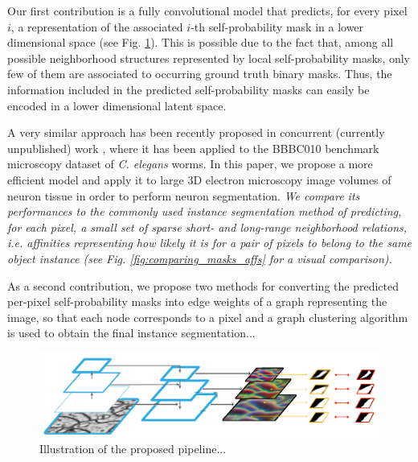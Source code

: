 Our first contribution is a fully convolutional model that predicts, for every pixel $i$, a representation of the associated $i$-th self-probability mask in a lower dimensional space (see Fig. \ref{fig:main_figure}). This is possible due to the fact that, among all possible neighborhood structures represented by local self-probability masks, only few of them are associated to occurring ground truth binary masks. Thus, the information included in the predicted self-probability masks can easily be encoded in a lower dimensional latent space. 

A very similar approach has been recently proposed in concurrent (currently unpublished) work \cite{hirsch2020patchperpix}, where it has been applied to the BBBC010 benchmark microscopy dataset of \emph{C. elegans} worms. In this paper, we propose a more efficient model and apply it to large 3D electron microscopy image volumes of neuron tissue in order to perform neuron segmentation. 
\emph{We compare its performances to the commonly used instance segmentation method of predicting, for each pixel, a small set of sparse short- and long-range neighborhood relations, i.e. affinities representing how likely it is for a pair of pixels to belong to the same object instance (see Fig. \ref{fig:comparing_masks_affs} for a visual comparison).}

As a second contribution, we propose two methods for converting the predicted per-pixel self-probability masks into edge weights of a graph representing the image, so that each node corresponds to a pixel and a graph clustering algorithm is used to obtain the final instance segmentation... 

\begin{figure}[t]
\centering
        \includegraphics[width=\textwidth]{./figs/main_image.pdf} %
        \caption{Illustration of the proposed pipeline...}
    \label{fig:main_figure}
\end{figure}


